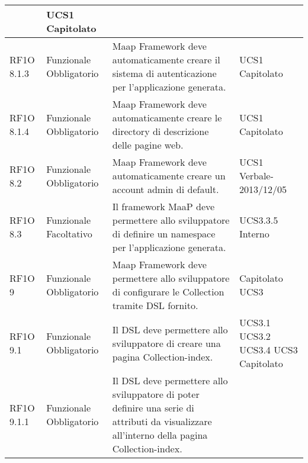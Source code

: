 \begin{center}
\begin{longtable}{ | l | p{2cm} | p{5cm} | p{1.7cm} |}
 &  UCS1 \newline  Capitolato \newline  \\ \hline      
        RF1O 8.1.3  & Funzionale \newline  Obbligatorio  & Maap Framework deve automaticamente creare il sistema di autenticazione per l'applicazione generata. &  UCS1 \newline  Capitolato \newline  \\ \hline      
        RF1O 8.1.4  & Funzionale \newline  Obbligatorio  & Maap Framework deve automaticamente creare le directory di descrizione delle pagine web.
 &  UCS1 \newline  Capitolato \newline  \\ \hline      
        RF1O 8.2  & Funzionale \newline  Obbligatorio  & Maap Framework deve automaticamente creare un account admin di default. &  UCS1 \newline  Verbale-2013/12/05 \newline  \\ \hline      
        RF1O 8.3 & Funzionale \newline  Facoltativo  & Il framework MaaP deve permettere allo sviluppatore di definire un namespace per l'applicazione generata. &  UCS3.3.5 \newline  Interno \newline  \\ \hline      
        RF1O 9  & Funzionale \newline  Obbligatorio  & Maap Framework deve permettere allo sviluppatore di configurare le Collection tramite DSL fornito.
 &  Capitolato \newline  UCS3 \newline  \\ \hline      
        RF1O 9.1  & Funzionale \newline  Obbligatorio  & Il DSL deve permettere allo sviluppatore di creare una pagina Collection-index.
 &  UCS3.1 \newline  UCS3.2 \newline  UCS3.4 \newline  UCS3 \newline  Capitolato \newline  \\ \hline      
        RF1O 9.1.1  & Funzionale \newline  Obbligatorio  & Il DSL deve permettere allo sviluppatore di poter definire una serie di attributi da visualizzare all'interno della pagina Collection-index.

\end{longtable}
\end{center}
